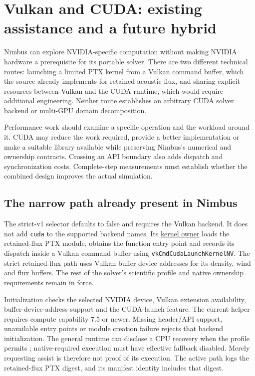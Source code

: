 \section{Vulkan and CUDA: existing assistance and a future hybrid}
\label{architecture-cuda-interop}

Nimbus can explore NVIDIA-specific computation without making NVIDIA hardware
a prerequisite for its portable solver. There are two different technical
routes: launching a limited PTX kernel from a Vulkan command buffer, which the
source already implements for retained acoustic flux, and sharing explicit
resources between Vulkan and the CUDA runtime, which would require additional
engineering. Neither route establishes an arbitrary CUDA solver backend or
multi-GPU domain decomposition.

Performance work should examine a specific operation and the workload around
it. CUDA may reduce the work required, provide a better implementation or make
a suitable library available while preserving Nimbus's numerical and ownership
contracts. Crossing an API boundary also adds dispatch and synchronization
costs. Complete-step measurements must establish whether the combined design
improves the actual simulation.

\subsection{The narrow path already present in Nimbus}
The strict-v1 selector  defaults to false
and requires the Vulkan backend. It does not add \texttt{cuda} to the supported
backend names. Its
\href{../vulkan/include/compute/vulkan_cuda_kernel.hpp}{kernel owner}
loads the retained-flux PTX module, obtains the function entry point and records
its dispatch inside a Vulkan command buffer using
\texttt{vkCmdCudaLaunchKernelNV}. The strict retained-flux path uses Vulkan
buffer device addresses for its density, wind and flux buffers. The rest of the
solver's scientific profile and native ownership requirements remain in force.

Initialization checks the selected NVIDIA device, Vulkan extension availability,
buffer-device-address support and the CUDA-launch feature. The current helper
requires compute capability 7.5 or newer. Missing header/API support, unavailable
entry points or module creation failure rejects that backend initialization.
The general runtime can disclose a CPU recovery when the profile permits
; native-required execution must have
effective fallback disabled. Merely requesting assist is therefore not proof of
its execution. The active path logs the retained-flux PTX digest, and its manifest
identity includes that digest.

